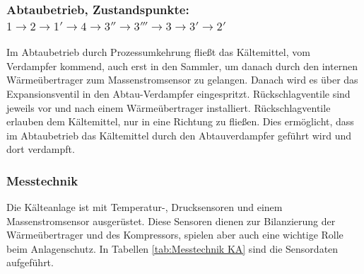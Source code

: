 \subsubsection*{Abtaubetrieb, Zustandspunkte: $1 \rightarrow 2 \rightarrow 1'\rightarrow 4 \rightarrow 3''\rightarrow  3''' \rightarrow 3 \rightarrow 3' \rightarrow 2' $}

Im Abtaubetrieb durch Prozessumkehrung fließt das Kältemittel, vom Verdampfer kommend, auch erst in den Sammler, um danach durch den internen Wärmeübertrager zum Massenstromsensor zu gelangen. Danach wird es über das Expansionsventil in den Abtau-Verdampfer eingespritzt. Rückschlagventile sind jeweils vor und nach einem Wärmeübertrager installiert. Rückschlagventile erlauben dem Kältemittel, nur in eine Richtung zu fließen. Dies ermöglicht, dass im Abtaubetrieb das Kältemittel durch den Abtauverdampfer geführt wird und dort verdampft. 










\subsubsection*{Messtechnik}
\label{subsubsec:Messtechnik}

Die Kälteanlage ist mit Temperatur-, Drucksensoren und einem Massenstromsensor ausgerüstet. Diese Sensoren dienen zur Bilanzierung der Wärmeübertrager und des Kompressors, spielen aber auch eine wichtige Rolle beim Anlagenschutz. In Tabellen \ref{tab:Messtechnik KA} sind die Sensordaten aufgeführt. 



